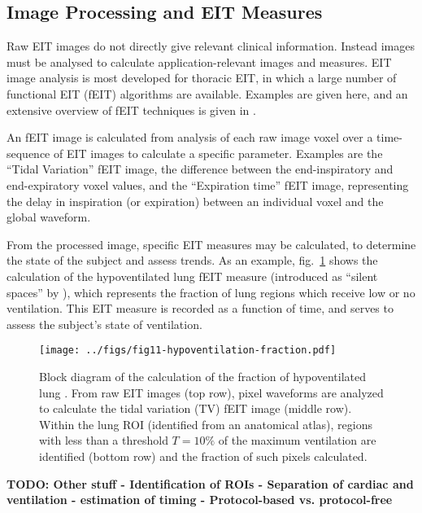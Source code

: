 \documentclass[12pt]{article} \usepackage[margin=3cm]{geometry} \usepackage[margin=20pt,font=small,labelfont=bf]{caption}\def\TBLWIDA{35mm}\def\TBLWIDB{95mm}
\newcommand{\TODO}[1]{{\bf TODO: #1}}
\newcommand\fref[1]{fig.\ \ref{#1}}
\begin{document}
\subsection{Image Processing and EIT Measures}

Raw EIT images do not directly give relevant clinical information.
Instead images must be analysed to calculate application-relevant images
and measures. 
EIT image analysis is most developed for thoracic EIT, in which a
large number of functional EIT (fEIT) algorithms are available.
Examples are given here, and an extensive overview of fEIT techniques
is given in  \cite{Frerichs2017Chest}.

An fEIT image is calculated from  analysis of each raw image voxel
over a time-sequence
of EIT images to calculate a specific parameter. Examples are
the
``Tidal Variation'' fEIT image,
the difference between the end-inspiratory and
end-expiratory voxel values, and
the
``Expiration time'' fEIT image, representing the delay
in inspiration (or expiration) between an individual
voxel and the global waveform.




  From the processed image, specific
EIT measures may be calculated, to determine the state of the subject
and assess trends.
As an example,
\fref{fig:fEIT_eg_silent_spaces} shows the
calculation of the hypoventilated lung fEIT measure 
(introduced as ``silent spaces'' by \cite{Waldmann2015Silent}),
which represents the fraction of lung regions which receive
low or no ventilation. This EIT measure is recorded as a function of time, and
serves to assess the subject's state of ventilation.

\begin{figure} \centering
   \texttt{[image: ../figs/fig11-hypoventilation-fraction.pdf]}
\caption{%
Block diagram of the calculation of the
fraction of hypoventilated lung \cite{Waldmann2015Silent}.
From raw EIT images (top row), pixel waveforms are analyzed
to calculate the tidal variation (TV) fEIT image (middle row).
Within the lung ROI (identified from an anatomical atlas),
regions with less than a threshold $T=10\%$ of the maximum ventilation
are identified (bottom row) and the fraction of such pixels calculated.
}
\label{fig:fEIT_eg_silent_spaces}
\end{figure}

\TODO{
Other stuff
 - Identification of ROIs
 - Separation of cardiac and ventilation
 - estimation of timing
 - Protocol-based vs. protocol-free
}
\end{document}
